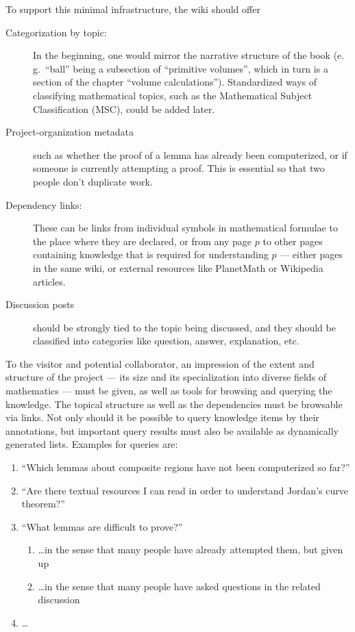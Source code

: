 To support this minimal infrastructure, the wiki should offer 

\begin{description}
\item[Categorization by topic:] In the beginning, one would mirror the narrative structure
  of the book (e.\,g.\ ``ball'' being a subsection of ``primitive volumes'', which in turn
  is a section of the chapter ``volume calculations'').  Standardized ways of classifying
  mathematical topics, such as the Mathematical Subject Classification
  (MSC)\cite{AMS:MSC2000}, could be added later.
\item[Project-organization metadata] such as whether the proof
  of a lemma has already been computerized, or if someone is currently 
  attempting a proof.  This is essential so that two people don't duplicate
  work.
\item[Dependency links:] These can be links from individual symbols in mathematical
  formulae to the place where they are declared, or from any page $p$ to other pages
  containing knowledge that is required for understanding $p$ --- either pages in the same
  wiki, or external resources like PlanetMath or Wikipedia articles.
\item[Discussion posts] should be strongly tied to the topic being discussed, and they
  should be classified into categories like question, answer, explanation,
  etc.
\end{description}

To the visitor and potential collaborator, an impression of the extent and structure of
the project --- its size and its specialization into diverse fields of
mathematics --- must be given, as well as tools for browsing and querying the knowledge.
The topical structure as well as the dependencies must be browsable via links.  Not only
should it be possible to query knowledge items by their annotations, but important query
results must also be available as dynamically generated lists.  Examples for queries are:

\begin{enumerate}
\item\label{item:proven-lemma} ``Which lemmas about composite regions have not been
  computerized so far?''
\item ``Are there textual resources I can read in order to understand Jordan's curve
  theorem?''
\item ``What lemmas are difficult to prove?''
  \begin{enumerate}
  \item \ldots in the sense that many people have already attempted them, but given up
  \item\label{item:question-count} \ldots in the sense that many people have asked
    questions in the related discussion
  \end{enumerate}
\item \ldots{}
\end{enumerate}

